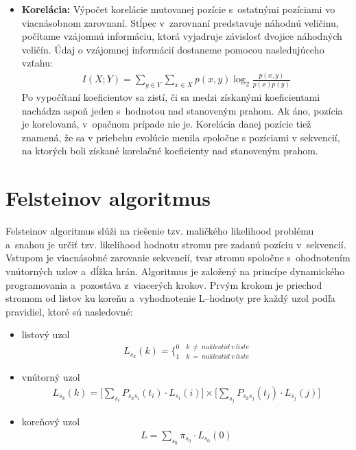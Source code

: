\begin{itemize}
	\item \textbf{Korelácia:} Výpočet korelácie mutovanej pozície s~ostatnými pozíciami vo viacnásobnom zarovnaní. Stĺpec v~zarovnaní predstavuje náhodnú veličinu, počítame vzájomnú informáciu, ktorá vyjadruje závislosť dvojice náhodných veličín. Údaj o vzájomnej informácií dostaneme pomocou nasledujúceho vzťahu: 	
	\begin{align}
	I(X;Y) = \underset{y \in Y}{\sum} \underset{x \in X}{\sum} p(x,y) \log_{2}\frac{p(x,y)}{p(x) p(y)}
	\end{align}  
	Po vypočítaní koeficientov sa zistí, či sa medzi získanými koeficientami nachádza aspoň jeden s~hodnotou nad stanoveným prahom. Ak áno, pozícia je korelovaná, v~opačnom prípade nie je. Korelácia danej pozície tiež znamená, že sa v priebehu evolúcie menila spoločne s pozíciami v sekvencií, na ktorých boli získané korelačné koeficienty nad stanoveným prahom. 
	
\end{itemize}

\section{Felsteinov algoritmus}
\label{felstein}
Felsteinov algoritmus slúži na riešenie tzv. maličkého likelihood problému a~snahou je určiť tzv. likelihood hodnotu stromu pre zadanú pozíciu v~sekvencií. Vstupom je viacnásobné zarovanie sekvencií, tvar stromu spoločne s~ohodnotením vnútorných uzlov a~dĺžka hrán. 
Algoritmus je založený na princípe dynamického programovania a~pozostáva z~viacerých krokov.
Prvým krokom je priechod stromom od listov ku koreňu a~vyhodnotenie L--hodnoty pre každý uzol podľa pravidiel, ktoré sú nasledovné:
\begin{itemize}
	\item listový uzol
	\begin{align}
	L_{s_{k}} (k) = \bigg\{_{1\quad k\ =\ nukleotid\ v\  liste}^{0\quad k\ \neq\ nukleotid\ v\  liste}
	\end{align}  
	
	\item vnútorný uzol
	\begin{align}
	L_{s_{k}} (k) = \Bigg[\underset{s_{i}}{\sum}P_{s_{k}s_{i}}(t_{i})\cdotp L_{s_{i}}(i)\Bigg] \times \Bigg[\underset{s_{j}}{\sum}P_{s_{k}s_{j}}(t_{j})\cdotp L_{s_{j}}(j)\Bigg]
	\end{align}
	
	\item koreňový uzol
	\begin{align}
	L = \underset{s_{0}}{\sum}\pi_{s_{0}} \cdotp L_{s_{0}}(0)
	\end{align} 

\end{itemize}


